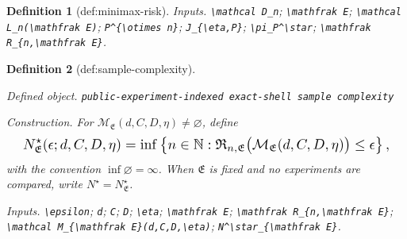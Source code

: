 \documentclass{article}
\newtheorem{definition}{Definition}
\begin{document}
\begin{definition}[def:minimax-risk]
\par\smallskip\noindent\emph{Inputs.} \texttt{\textbackslash{}\allowbreak{}mathcal D\_\allowbreak{}n}; \texttt{\textbackslash{}\allowbreak{}mathfrak E}; \texttt{\textbackslash{}\allowbreak{}mathcal L\_\allowbreak{}n(\textbackslash{}\allowbreak{}mathfrak E)}; \texttt{P\textasciicircum{}\{\textbackslash{}\allowbreak{}otimes n\}\allowbreak{}}; \texttt{J\_\allowbreak{}\{\textbackslash{}\allowbreak{}eta,\allowbreak{}P\}\allowbreak{}}; \texttt{\textbackslash{}\allowbreak{}pi\_\allowbreak{}P\textasciicircum{}\textbackslash{}\allowbreak{}star}; \texttt{\textbackslash{}\allowbreak{}mathfrak R\_\allowbreak{}\{n,\allowbreak{}\textbackslash{}\allowbreak{}mathfrak E\}\allowbreak{}}.
\end{definition}

\begin{definition}[def:sample-complexity]\label{def:sample-complexity}
\par\smallskip\noindent\emph{Defined object.} \texttt{public-\allowbreak{}experiment-\allowbreak{}indexed exact-\allowbreak{}shell sample complexity}
\par\smallskip\noindent\emph{Construction.} For \(\mathcal M_{\mathfrak E}(d,C,D,\eta)\ne\varnothing\), define
\[
\makebox[\linewidth][c]{\resizebox{0.98\linewidth}{!}{\par\noindent \makebox[\linewidth][c]{\resizebox{0.98\linewidth}{!}{\(\displaystyle \displaystyle N^\star_{\mathfrak E}(\epsilon;d,C,D,\eta)=\inf\left\{n\in\mathbb N:\mathfrak R_{n,\mathfrak E}\bigl(\mathcal M_{\mathfrak E}(d,C,D,\eta)\bigr)\le\epsilon\right\},\)}}\par\noindent}}
\]
with the convention \(\inf\varnothing=\infty\). When \(\mathfrak E\) is fixed and no experiments are compared, write \(N^\star=N^\star_{\mathfrak E}\).
\par\smallskip\noindent\emph{Inputs.} \texttt{\textbackslash{}\allowbreak{}epsilon}; \texttt{d}; \texttt{C}; \texttt{D}; \texttt{\textbackslash{}\allowbreak{}eta}; \texttt{\textbackslash{}\allowbreak{}mathfrak E}; \texttt{\textbackslash{}\allowbreak{}mathfrak R\_\allowbreak{}\{n,\allowbreak{}\textbackslash{}\allowbreak{}mathfrak E\}\allowbreak{}}; \texttt{\textbackslash{}\allowbreak{}mathcal M\_\allowbreak{}\{\textbackslash{}\allowbreak{}mathfrak E\}\allowbreak{}(d,\allowbreak{}C,\allowbreak{}D,\allowbreak{}\textbackslash{}\allowbreak{}eta)}; \texttt{N\textasciicircum{}\textbackslash{}\allowbreak{}star\_\allowbreak{}\{\textbackslash{}\allowbreak{}mathfrak E\}\allowbreak{}}.
\end{definition}
\end{document}
